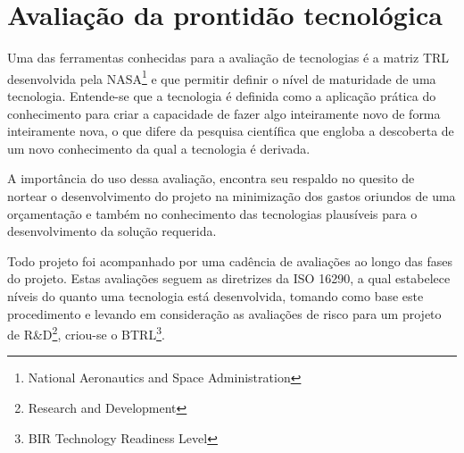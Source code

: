 \section{Avaliação da prontidão tecnológica}
\label{sec:trl}
Uma das ferramentas conhecidas para a avaliação de tecnologias é a matriz TRL desenvolvida pela NASA\footnote{National Aeronautics and Space Administration} e que permitir definir o nível de maturidade de uma tecnologia. Entende-se que a tecnologia é definida como a aplicação prática do conhecimento para criar a capacidade de fazer algo inteiramente novo de forma inteiramente nova, o que difere da pesquisa científica que engloba a descoberta de um novo conhecimento da qual a tecnologia é derivada.

A importância do uso dessa avaliação, encontra seu respaldo no quesito de nortear o desenvolvimento do projeto na minimização dos gastos oriundos de uma orçamentação e também no conhecimento das tecnologias plausíveis para o desenvolvimento da solução requerida.

Todo projeto foi acompanhado por uma cadência de avaliações ao longo das fases do projeto. Estas avaliações seguem as diretrizes da ISO 16290, a qual estabelece níveis do quanto uma tecnologia está desenvolvida, tomando como base este procedimento e levando em consideração as avaliações de risco para um projeto de R\&D\footnote{Research and Development}, criou-se o BTRL\footnote{BIR Technology Readiness Level}. 

